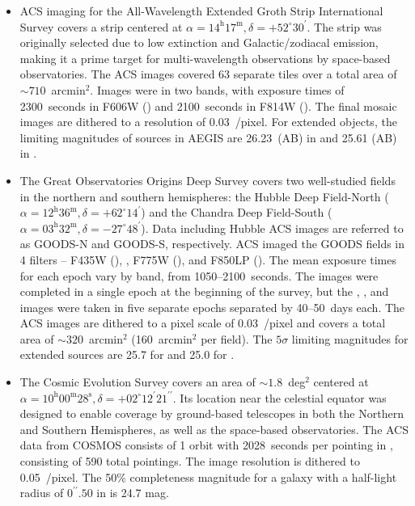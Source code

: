 \documentclass[usenatbib]{mn2e}
\begin{document}
\begin{itemize}
\item \hubble{} ACS imaging for the All-Wavelength Extended Groth Strip International Survey \citep[AEGIS;][]{dav07} covers a strip centered at $\alpha=14^\textrm{h}17^\textrm{m}, \delta=+52^\circ30^\prime$. The strip was originally selected due to low extinction and Galactic/zodiacal emission, making it a prime target for multi-wavelength observations by space-based observatories. The ACS images covered 63 separate tiles over a total area of $\sim710$~arcmin$^2$. Images were in two bands, with exposure times of 2300~seconds in F606W (\Vband) and 2100~seconds in F814W (\Iband). The final mosaic images are dithered to a resolution of 0.03~\arcsec/pixel. For extended objects, the limiting magnitudes of sources in AEGIS are 26.23~(AB) in \Vband{} and 25.61 (AB) in \Iband. 

\item The Great Observatories Origins Deep Survey \citep[GOODS;][]{gia04} covers two well-studied fields in the northern and southern hemispheres: the Hubble Deep Field-North ($\alpha=12^\textrm{h}36^\textrm{m}, \delta=+62^\circ14^\prime$) and the Chandra Deep Field-South ($\alpha=03^\textrm{h}32^\textrm{m}, \delta=-27^\circ48^\prime$). Data including Hubble ACS images are referred to as GOODS-N and GOODS-S, respectively. ACS imaged the GOODS fields in 4 filters -- F435W (\Bband), \Vband, F775W (\iband), and F850LP (\zband). The mean exposure times for each epoch vary by band, from 1050--2100~seconds. The \Bband{} images were completed in a single epoch at the beginning of the survey, but the \Vband, \iband, and \zband{} images were taken in five separate epochs separated by 40--50~days each. The ACS images are dithered to a pixel scale of 0.03~\arcsec/pixel and covers a total area of $\sim320$~arcmin$^2$ (160~arcmin$^2$ per field). The $5\sigma$ limiting magnitudes for extended sources are 25.7 for \Vband{} and 25.0 for \iband. 

\item The Cosmic Evolution Survey \citep[COSMOS;][]{sco07} covers an area of $\sim1.8$~deg$^2$ centered at $\alpha=10^\textrm{h}00^\textrm{m}28^\textrm{s}, \delta=+02^\circ12^\prime21^{\prime\prime}$. Its location near the celestial equator was designed to enable coverage by ground-based telescopes in both the Northern and Southern Hemispheres, as well as the space-based observatories. The \hst{} ACS data from COSMOS consists of 1 orbit with 2028~seconds per pointing in \Iband, consisting of 590 total pointings. The image resolution is dithered to 0.05~\arcsec/pixel. The 50\% completeness magnitude for a galaxy with a half-light radius of $0^{\prime\prime}.50$ in \Iband{} is 24.7 mag. 


\end{itemize}
\end{document}
